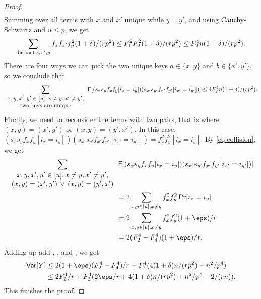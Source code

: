 \begin{proof}
\begin{align*}
    \end{align*}    
    Summing over all terms with $x$ and $x'$ unique while $y=y'$, and
    using Cauchy-Schwartz and $u\leq p$, we get 
    \begin{align*}
        \sum_{{\rm distinct}\,x,x',y} f_xf_{x'}f_y^2 (1 + \delta) /(rp^2) 
            \le F_1^2F_2^2 (1 + \delta)/(rp^2)
            \le F_2^4 n(1 + \delta)/(rp^2).
    \end{align*}
    There are four ways we can pick the two unique keys $a\in \{x,y\}$
    and $b\in \{x',y'\}$, so we conclude that
    \begin{equation}\label{eq:one-pair}
        \sum_{\begin{array}{c}
            x,y,x',y'\in[u], x\neq y, x'\neq y',\\
            {\rm two\ keys\ are\ unique}
        \end{array}}
        \operatorname*{\sf{E}}[(s_x s_y f_x f_y [i_x = i_y]) (s_{x'} s_{y'} f_{x'} f_{y'}[i_{x'} = i_{y'}])]
            \le 4 F_2^4 n(1 + \delta)/(rp^2) .
    \end{equation}
    Finally, we need to reconsider the terms with two pairs, that
    is where $(x,y)=(x',y')$ or $(x,y)=(y',x')$. In
    this case, $(s_x s_y f_x f_y [i_x = i_y]) (s_{x'} s_{y'} f_{x'} f_{y'}[i_{x'} = i_{y'}]) = f_x^2 f_y^2 [i_x = i_y]$.
    By \cref{eq:collision}, we get 
    \begin{equation}\begin{split}    
        \sum_{\begin{array}{c}
            x,y,x',y'\in[u], x\neq y, x'\neq y',\\
            (x,y)=(x',y')\,\vee\,(x,y)=(y',x')
        \end{array}}&
            \E[(s_x s_y f_x f_y [i_x = i_y]) (s_{x'} s_{y'} f_{x'} f_{y'}[i_{x'} = i_{y'}])]
            \\&=2\sum_{x,y\in[u],x\neq y} f_x^2f_y^2 \Pr[i_x=i_y]
            \\&=2\sum_{x,y\in[u],x\neq y} f_x^2f_y^2 (1 + \eps)/r
            \\&=2(F_2^4 - F_4^4)(1 + \eps)/r .\label{eq:two-pairs}
    \end{split}\end{equation}
    Adding up add , , and
    , we get 
    \begin{align*}
        \Var[Y]
            &\le 2(1 + \eps)(F_2^4 - F_4^4)/r + F_2^4(4(1 + \delta) n / (rp^2) + n^2/p^4)
            \\&\le 2F_2^4/r + F_2^4 (2\eps/r + 4(1 + \delta)n / (rp^2) + n^2/p^4 - 2 /(rn)) .
    \end{align*}
    This finishes the proof.
\end{proof}

